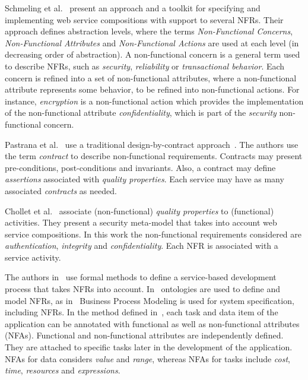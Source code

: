 \documentclass{singlecol-new}
\theoremstyle{TH}{
\newtheorem{lemma}{Lemma}
\newtheorem{theorem}[lemma]{Theorem}
\newtheorem{corrolary}[lemma]{Corrolary}
\newtheorem{conjecture}[lemma]{Conjecture}
\newtheorem{proposition}[lemma]{Proposition}
\newtheorem{claim}[lemma]{Claim}
\newtheorem{stheorem}[lemma]{Wrong Theorem}
\newtheorem{algorithm}{Algorithm}
}
\theoremstyle{THrm}{
\newtheorem{definition}{Definition}[section]
\newtheorem{question}{Question}[section]
\newtheorem{remark}{Remark}
\newtheorem{scheme}{Scheme}
}
\theoremstyle{THhit}{
\newtheorem{case}{Case}[section]
}
\theoremstyle{THhsl}{
\newtheorem{example}{Example}
}
\begin{document}
Schmeling et al.~\cite{SchmelingCM11} present an approach and a toolkit for specifying and implementing web service compositions with support to several NFRs.
Their approach defines abstraction levels, where the terms \textit{Non-Functional Concerns}, \textit{Non-Functional Attributes} and \textit{Non-Functional Actions} are used at each level (in decreasing order of abstraction).
A non-func\-tion\-al concern is a general term used to describe NFRs, such as  \textit{security}, \textit{reliability} or \textit{transactional behavior}.
Each  concern is refined into a set of non-func\-tion\-al  at\-tri\-butes, where
a non-func\-tion\-al at\-tri\-bute represents some behavior, to be refined into non-functional actions.
For instance, \textit{encryption} is a non-func\-tion\-al  action  which provides the implementation of the non-functional attribute \textit{confidentiality}, which is part of the \textit{security} non-functional concern.

Pastrana et al.~\cite{PastranaPK11} use a traditional design-by-contract approach~\cite{Meyer97}.
The authors use the term \textit{contract} to describe non-functional re\-quire\-ments.
Contracts may present pre-con\-di\-tions, post-conditions and invariants.
Also, a con\-tract may define \textit{assertions} associated with \textit{qual\-i\-ty properties}.
Each service may have as many associated \textit{contracts} as needed.

Chollet et al.~\cite{CholletL09} associate (non-func\-tion\-al) \textit{quality properties} to
(functional) activities.
They present a security meta-model that takes into account web service compositions.
In this work the non-functional requirements considered are  \textit{authentication}, \textit{integrity} and \textit{confidentiality}.
Each NFR is associated with a service activity.




The authors in~\cite{ThissenW06,ZhangPSP05} use formal methods to define a service-based development process that takes NFRs into account.
In~\cite{AgarwalLS09,PastranaPK11} ontologies are used to define and model NFRs,
as  in~\cite{XiaoCZBOLH08,GutierrezRF10} Business Process Modeling is used for
system specification, including NFRs.
In the method defined in~\cite{XiaoCZBOLH08}, each task and data item of the application can be
annotated with functional as well as non-functional attributes (NFAs).
Functional and non-functional at\-tri\-butes are independently defined.
They are attached to specific tasks later in the development of the application.
NFAs for data considers \textit{value} and \textit{range}, whereas NFAs for tasks include \textit{cost}, \textit{time}, \textit{resources} and \textit{expressions}.
\end{document}
